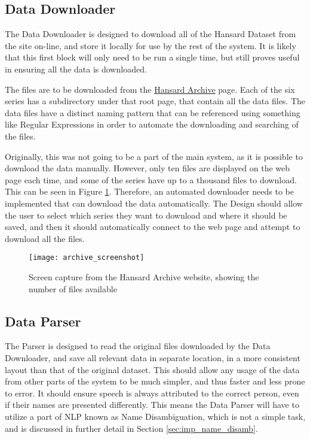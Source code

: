 \subsection{Data Downloader}
\label{sec:des_data_downloader}
The Data Downloader is designed to download all of the Hansard Dataset from the site on-line, and store it locally for use by the rest of the system. It is likely that this first block will only need to be run a single time, but still proves useful in ensuring all the data is downloaded.

The files are to be downloaded from the \href{http://www.hansard-archive.parliament.uk}{Hansard Archive} page. Each of the six series has a subdirectory under that root page, that contain all the data files. The data files have a distinct naming pattern that can be referenced using something like Regular Expressions in order to automate the downloading and searching of the files.

Originally, this was not going to be a part of the main system, as it is possible to download the data manually. However, only ten files are displayed on the web page each time, and some of the series have up to a thousand files to download. This can be seen in Figure \ref{fig:Archive_Screenshot}. Therefore, an automated downloader needs to be implemented that can download the data automatically. The Design should allow the user to select which series they want to download and where it should be saved, and then it should automatically connect to the web page and attempt to download all the files.

\begin{figure}[ht]
	\texttt{[image: archive\_screenshot]}
	\caption{Screen capture from the Hansard Archive website, showing the number of files available}
	\label{fig:Archive_Screenshot}
\end{figure}

\subsection{Data Parser}
\label{sec:des_data_parser}
The Parser is designed to read the original files downloaded by the Data Downloader, and save all relevant data in separate location, in a more consistent layout than that of the original dataset. This should allow any usage of the data from other parts of the system to be much simpler, and thus faster and less prone to error. It should ensure speech is always attributed to the correct person, even if their names are presented differently. This means the Data Parser will have to utilize a part of NLP known as Name Disambiguation, which is not a simple task, and is discussed in further detail in Section \ref{sec:imp_name_disamb}.

